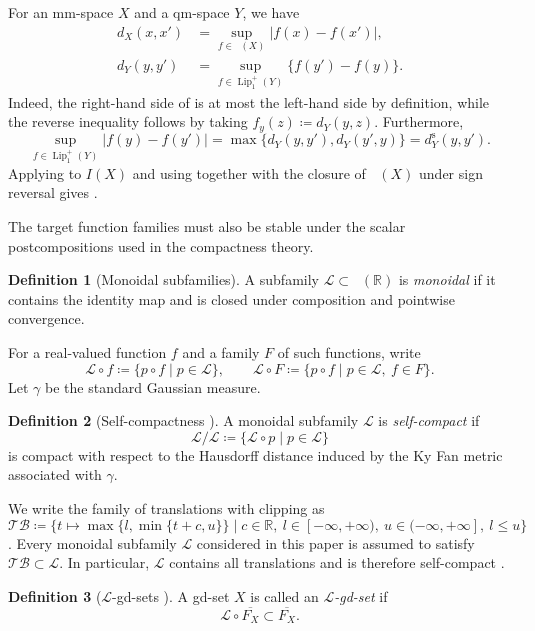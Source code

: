 \documentclass{amsart}
\theoremstyle{plain}
\theoremstyle{definition}
\newtheorem*{definition*}{Definition}
\theoremstyle{remark}
\newcommand{\R}{\mathbb{R}}
\renewcommand{\L}{\mathcal{L}}
\newcommand{\TB}{\mathcal{TB}}
\newcommand{\lipplus}{\operatorname{Lip}^{+}_{1}}
\DeclareMathOperator{\lipone}{Lip_1}
\begin{document}
For an mm-space $X$ and a qm-space $Y$, we have
\begin{align}
d_X(x,x')&=\sup_{f\in\lipone(X)}|f(x)-f(x')|,\label{eq:symmetric-recovery}\\
d_Y(y,y')&=\sup_{f\in\lipplus(Y)}\{f(y')-f(y)\}.\label{eq:directed-recovery}
\end{align}
Indeed, the right-hand side of  is at most the left-hand side by definition, while the reverse inequality follows by taking $f_y(z)\coloneqq d_Y(y,z)$. Furthermore,
\[\sup_{f\in\lipplus(Y)}|f(y)-f(y')|=\max\{d_Y(y,y'),d_Y(y',y)\}=d_Y^{\mathrm s}(y,y').\]
Applying  to $I(X)$ and using  together with the closure of $\lipone(X)$ under sign reversal gives .

The target function families must also be stable under the scalar postcompositions used in the compactness theory.

\begin{definition*}[Monoidal subfamilies]
A subfamily $\L\subset\lipone(\R)$ is \emph{monoidal} if it contains the identity map and is closed under composition and pointwise convergence.
\end{definition*}
For a real-valued function $f$ and a family $F$ of such functions, write
\[
\L\circ f\coloneqq\{p\circ f\mid p\in\L\},\qquad
\L\circ F\coloneqq\{p\circ f\mid p\in\L,\ f\in F\}.
\]
Let $\gamma$ be the standard Gaussian measure.
\begin{definition*}[Self-compactness {\cite[Definition~3.12]{gds2}}]
A monoidal subfamily $\L$ is \emph{self-compact} if
\[\L/\L\coloneqq\{\L\circ p\mid p\in\L\}\]
is compact with respect to the Hausdorff distance induced by the Ky Fan metric associated with $\gamma$.
\end{definition*}
We write the family of translations with clipping as
\[
\TB\coloneqq\{t\mapsto\max\{l,\min\{t+c,u\}\}\mid c\in\R,\ l\in[-\infty,+\infty),\ u\in(-\infty,+\infty],\ l\leq u\}
\]
\cite[Definitions~3.1 and~3.2]{gds2}. Every monoidal subfamily $\L$ considered in this paper is assumed to satisfy $\TB\subset\L$. In particular, $\L$ contains all translations and is therefore self-compact \cite[Proposition~3.14]{gds2}.

\begin{definition*}[$\L$-gd-sets {\cite[Definition~3.5]{gds2}}]
A gd-set $X$ is called an \emph{$\L$-gd-set} if
\[\L\circ\overline{F_X}\subset\overline{F_X}.\]
\end{definition*}
\end{document}
